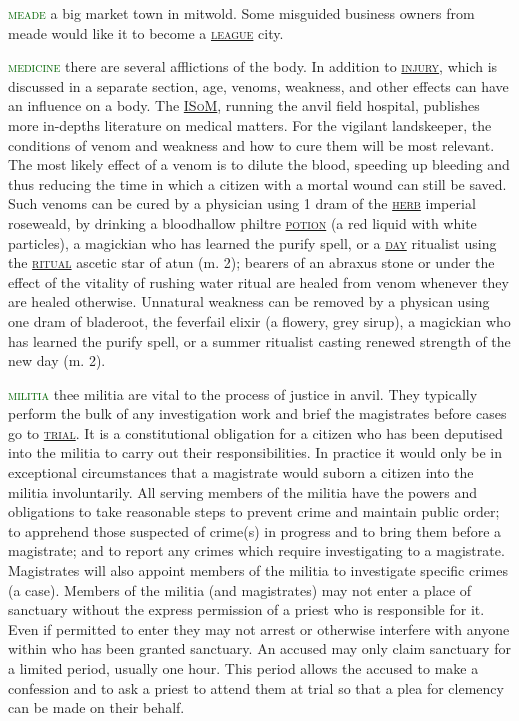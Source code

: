 \documentclass[twoside,11pt,b5paper,twocolumn]{scrbook}
\newcommand{\estcab}[1]{\textsc{\textcolor{marron}{#1}}}
\renewcommand{\paragraph}[1]{\par\noindent\markboth{#1}{#1}\estcab{\textcolor{darkgreen}{#1}}\label{#1} }
\newcommand{\see}[1]{{\estcab{\hyperref[#1]{#1}}}}
\begin{document}
\paragraph{meade} a big market town in mitwold. Some misguided business owners from meade would like it to become a \see{league} city.
\paragraph{medicine} there are several afflictions of the body. In addition to \see{injury}, which is discussed in a separate section, age, venoms, weakness, and other effects can have an influence on a body. The \see{ISoM}, running the anvil field hospital, publishes more in-depths literature on medical matters. For the vigilant landskeeper, the conditions of venom and weakness and how to cure them will be most relevant. The most likely effect of a venom is to dilute the blood, speeding up bleeding and thus reducing the time in which a citizen with a mortal wound can still be saved. Such venoms can be cured by a physician using 1 dram of the \see{herb} imperial roseweald, by drinking a bloodhallow philtre \see{potion} (a red liquid with white particles), a magickian who has learned the purify spell, or a \see{day} ritualist using the \see{ritual} ascetic star of atun (m. 2); bearers of an abraxus stone or under the effect of the vitality of rushing water ritual are healed from venom whenever they are healed otherwise. Unnatural weakness can be removed by a physican using one dram of bladeroot, the feverfail elixir (a flowery, grey sirup), a magickian who has learned the purify spell, or a summer ritualist casting renewed strength of the new day (m. 2).
\paragraph{militia} thee militia are vital to the process of justice in anvil. They typically perform the bulk of any investigation work and brief the magistrates before cases go to \see{trial}. It is a constitutional obligation for a citizen who has been deputised into the militia to carry out their responsibilities. In practice it would only be in exceptional circumstances that a magistrate would suborn a citizen into the militia involuntarily. All serving members of the militia have the powers and obligations to take reasonable steps to prevent crime and maintain public order; to apprehend those suspected of crime(s) in progress and to bring them before a magistrate; and to report any crimes which require investigating to a magistrate. Magistrates will also appoint members of the militia to investigate specific crimes (a case). Members of the militia (and magistrates) may not enter a place of sanctuary without the express permission of a priest who is responsible for it. Even if permitted to enter they may not arrest or otherwise interfere with anyone within who has been granted sanctuary. An accused may only claim sanctuary for a limited period, usually one hour. This period allows the accused to make a confession and to ask a priest to attend them at trial so that a plea for clemency can be made on their behalf.
\end{document}
